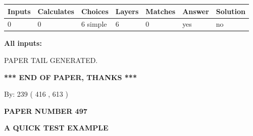 \documentclass[12pt]{article}
\begin{document}
 
\noindent{}
 
 
   
   
   
   
\noindent\begin{tabular}{|l|l|l|l|l|l|l|}
 \hline
Inputs & Calculates & Choices & Layers & Matches & Answer & Solution \\ \hline
 0  & 
 0  & 
 6
  simple  
  & 
 6  & 
 0  & 
  yes & 
  no 
  \\ \hline
 \end{tabular}
   
   
   
   
\noindent{}
   
   
   
   
\noindent\vspace{0.1in}\hspace{-0.08in} {\textbf{\Large{All inputs: }}}
   
   
   
   
   
   
 \vspace{0.2in}
 
   
   
\vspace{2.0in} PAPER TAIL GENERATED.
   
   
   
   
\vspace{1.0in} 
{\textbf{\large{ *** END OF PAPER, THANKS *** }}} 
   
   
\hspace{1.0in} By: 
 239 ( 416 ,  613 )
   
   
   
   
\newpage 
\setcounter{page}{ 
   497001 } 
   
   
   
   
 {\textbf{ \Large{ PAPER NUMBER  497  }}}
   
   
\vspace{0.2in}
   
   
   
   
   
   
   
   
 \vspace{0.2in}
{\LARGE {\textbf{ A QUICK TEST EXAMPLE}}}
   
\end{document}
